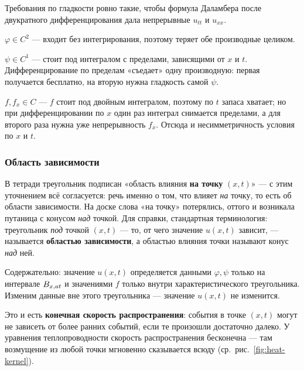 \begin{idea}
Требования по гладкости ровно такие, чтобы формула Даламбера после двукратного
дифференцирования дала непрерывные $u_{tt}$ и $u_{xx}$.

\medskip
$\varphi \in C^2$ — входит без интегрирования, поэтому теряет обе производные
целиком.

\medskip
$\psi \in C^1$ — стоит под интегралом с пределами, зависящими от $x$ и $t$.
Дифференцирование по пределам «съедает» одну производную: первая получается
бесплатно, на вторую нужна гладкость самой $\psi$.

\medskip
$f, f_x \in C$ — $f$ стоит под двойным интегралом, поэтому по $t$ запаса
хватает; но при дифференцировании по $x$ один раз интеграл снимается
пределами, а для второго раза нужна уже непрерывность $f_x$. Отсюда и
несимметричность условия по $x$ и $t$.
\end{idea}

\subsubsection*{Область зависимости}


\begin{warn}
В тетради треугольник подписан «область влияния \textbf{на точку} $(x,t)$» — с
этим уточнением всё согласуется: речь именно о том, что влияет \emph{на} точку,
то есть об области зависимости. На доске слова «на точку» потерялись, оттого и
возникала путаница с конусом \emph{над} точкой. Для справки, стандартная
терминология:
треугольник \emph{под} точкой $(x,t)$ — то, от чего значение $u(x,t)$ зависит, —
называется \textbf{областью зависимости}, а областью влияния точки называют конус
\emph{над} ней.
\end{warn}

\begin{idea}
Содержательно: значение $u(x,t)$ определяется данными $\varphi, \psi$ только на
интервале $B_{x,at}$ и значениями $f$ только внутри характеристического
треугольника. Изменим данные вне этого треугольника — значение $u(x,t)$ не
изменится.

\medskip
Это и есть \textbf{конечная скорость распространения}: события в точке $(x,t)$
могут не зависеть от более ранних событий, если те произошли достаточно далеко.
У уравнения теплопроводности скорость распространения бесконечна — там
возмущение из любой точки мгновенно сказывается всюду
(ср.~рис.~\ref{fig:heat-kernel}).
\end{idea}

